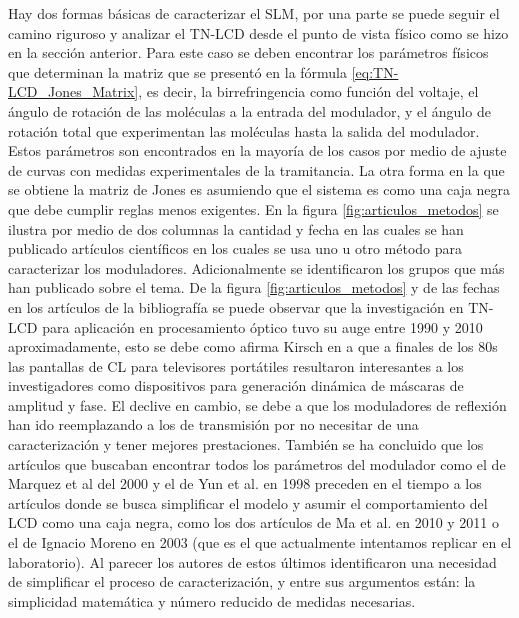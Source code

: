 Hay dos formas básicas de caracterizar el
SLM, por una parte se puede seguir el camino riguroso y analizar el
TN-LCD desde el punto de vista físico como se hizo en la sección
anterior. Para este caso se deben encontrar los parámetros físicos que
determinan la matriz que se presentó en la fórmula
\ref{eq:TN-LCD_Jones_Matrix}, es decir, la 
birrefringencia como función del voltaje, el ángulo de rotación de las
moléculas a la entrada del modulador, y el ángulo de rotación total
que experimentan las moléculas hasta la salida del modulador. Estos
parámetros son encontrados en la mayoría de los casos por medio de
ajuste de curvas con medidas experimentales de la tramitancia.  La
otra forma en la que se obtiene la matriz de Jones es asumiendo que el
sistema es como una caja negra que debe cumplir reglas menos
exigentes. En la figura \ref{fig:articulos_metodos} se ilustra por
medio de dos columnas la cantidad y fecha en las cuales se han
publicado artículos científicos en los cuales se usa uno u otro método
para caracterizar los moduladores. Adicionalmente se identificaron los
grupos que más han publicado sobre el tema. De la figura
\ref{fig:articulos_metodos} y de las fechas en los artículos de la
bibliografía se puede observar que la investigación en TN-LCD para
aplicación en procesamiento óptico tuvo su auge entre 1990 y 2010
aproximadamente, esto se debe como afirma Kirsch en 
a que a finales de los 80s las pantallas 
de CL para televisores portátiles resultaron interesantes a los
investigadores como dispositivos para generación dinámica de máscaras
de amplitud y fase. El declive en cambio, se debe a que los
moduladores de reflexión han ido reemplazando a los de transmisión por
 no necesitar de una caracterización y tener mejores prestaciones. 
También se ha concluido que los artículos que buscaban encontrar todos los
parámetros del modulador como el de Marquez et al del 2000 y
el de Yun et al. en 1998  preceden en el tiempo a los artículos
donde se busca simplificar el modelo y asumir el comportamiento del
LCD como una caja negra, como los dos artículos de Ma et al. en 2010 y
2011  o el de Ignacio Moreno en 2003  (que
es el que actualmente intentamos replicar en el laboratorio). Al
parecer los autores de estos últimos identificaron una necesidad de
simplificar el proceso de caracterización, y entre sus argumentos 
están: la simplicidad matemática y número reducido de medidas necesarias.


